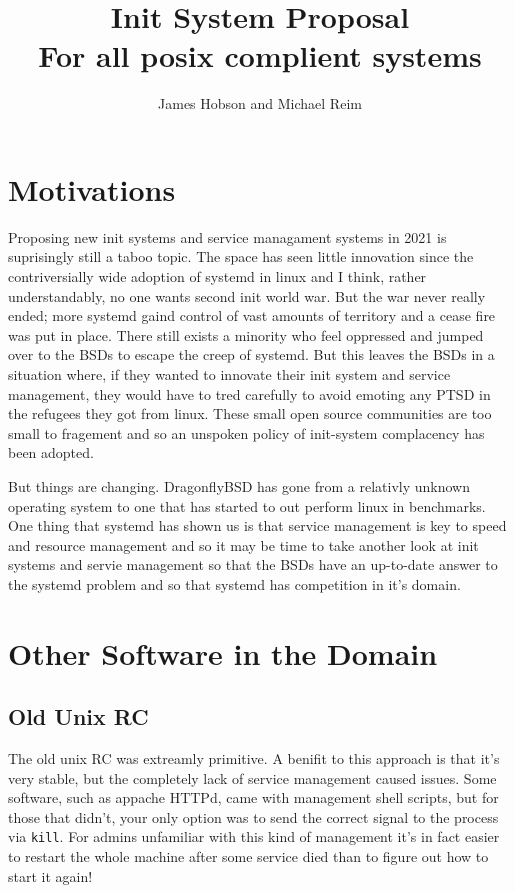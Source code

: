 \documentclass{article}
\title{Init System Proposal\\ \large{For all posix complient systems}}
\author{James Hobson and Michael Reim}
\begin{document}
\maketitle

\tableofcontents

\section{Motivations}
Proposing new init systems and service managament systems in 2021 is suprisingly still a taboo
topic. The space has seen little innovation since the contriversially wide adoption of systemd
in linux and I think, rather understandably, no one wants second init world war. But the
war never really ended; more systemd gaind control of vast amounts of territory and a cease
fire was put in place. There still exists a minority who feel oppressed and jumped over to
the BSDs to escape the creep of systemd. But this leaves the BSDs in a situation where,
if they wanted to innovate their init system and service management, they would have
to tred carefully to avoid emoting any PTSD in the refugees they got from linux. These
small open source communities are too small to fragement and so an unspoken policy of 
init-system complacency has been adopted.

But things are changing. DragonflyBSD has gone from a relativly unknown operating
system to one that has started to out perform linux in benchmarks.
One thing that systemd has shown us is that service management is key to speed and
resource management and so it may be time to take another look at init systems and servie
management so that the BSDs have an up-to-date answer to the systemd problem and
so that systemd has competition in it's domain.

\section{Other Software in the Domain}
\subsection{Old Unix RC}
\nocite{unix-ii}
The old unix RC was extreamly primitive. A benifit to this approach is that it's very stable,
but the completely lack of service management caused issues. Some software, such as
appache HTTPd, came with management shell scripts, but
for those that didn't, your only option was to send the correct signal to the process
via \texttt{kill}. For admins unfamiliar with this kind of management it's in fact easier to
restart the whole machine after some service died than to figure out how to start it again!
\end{document}
